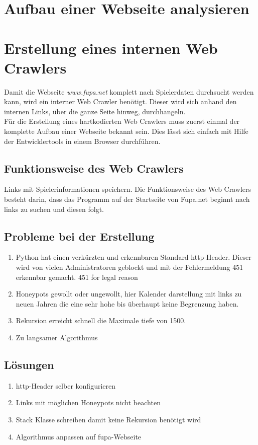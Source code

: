 \section{Aufbau einer Webseite analysieren}

\section{Erstellung eines internen Web Crawlers} %
	\label{sse:}
	Damit die Webseite \textit{www.fupa.net} komplett nach Spielerdaten durchsucht werden kann, wird ein interner Web Crawler benötigt. Dieser wird sich anhand den internen Links, über die ganze Seite hinweg, durchhangeln.\\
	Für die Erstellung eines hartkodierten Web Crawlers muss zuerst einmal der komplette Aufbau einer Webseite bekannt sein. Dies lässt sich einfach mit Hilfe der Entwicklertools in einem Browser durchführen. %
	
	\subsection{Funktionsweise des Web Crawlers}
	Links mit Spielerinformationen speichern.
	Die Funktionsweise des Web Crawlers besteht darin, dass das Programm auf der Startseite von Fupa.net beginnt nach links zu suchen und diesen folgt.
	\subsection{Probleme bei der Erstellung} %
	\begin{enumerate}
		\item Python hat einen verkürzten und erkennbaren Standard http-Header. Dieser wird von vielen Administratoren geblockt und mit der Fehlermeldung 451 erkennbar gemacht. 451 for legal reason
		\item Honeypots gewollt oder ungewollt, hier Kalender darstellung mit links zu neuen Jahren die eine sehr hohe bis überhaupt keine Begrenzung haben.
		\item Rekursion erreicht schnell die Maximale tiefe von 1500.
		\item Zu langsamer Algorithmus
	\end{enumerate}
	
	
	\subsection{Lösungen}
	\begin{enumerate}
		\item http-Header selber konfigurieren
		\item Links mit möglichen Honeypots nicht beachten
		\item Stack Klasse schreiben damit keine Rekursion benötigt wird
		\item Algorithmus anpassen auf fupa-Webseite
	\end{enumerate}


